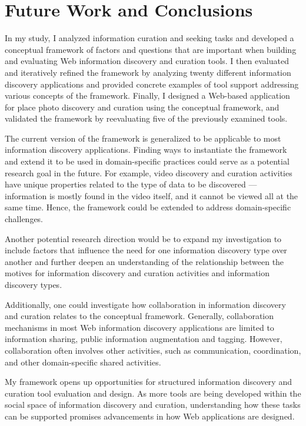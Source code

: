 \chapter{Future Work and Conclusions}
\label{chapter:future_work}


In my study, I analyzed information curation and seeking tasks and developed a conceptual framework of factors and questions that are important when building and evaluating Web information discovery and curation tools. I then evaluated and iteratively refined the framework by analyzing twenty different information discovery applications and provided concrete examples of tool support addressing various concepts of the framework. Finally, I designed a Web-based application for place photo discovery and curation using the conceptual framework, and validated the framework by reevaluating five of the previously examined tools.

The current version of the framework is generalized to be applicable to most information discovery applications. Finding ways to instantiate the framework and extend it to be used in domain-specific practices could serve as a potential research goal in the future. For example, video discovery and curation activities have unique properties related to the type of data to be discovered --- information is mostly found in the video itself, and it cannot be viewed all at the same time. Hence, the framework could be extended to address domain-specific challenges. 

Another potential research direction would be to expand my investigation to include factors that influence the need for one information discovery type over another and further deepen an understanding of the relationship between the motives for information discovery and curation activities and information discovery types. 

\pagebreak
Additionally, one could investigate how collaboration in information discovery and curation relates to the conceptual framework. Generally, collaboration mechanisms in most Web information discovery applications are limited to information sharing, public information augmentation and tagging. However, collaboration often involves other activities, such as communication, coordination, and other domain-specific shared activities.

My framework opens up opportunities for structured information discovery and curation tool evaluation and design. As more tools are being developed within the social space of information discovery and curation, understanding how these tasks can be supported promises advancements in how Web applications are designed.




